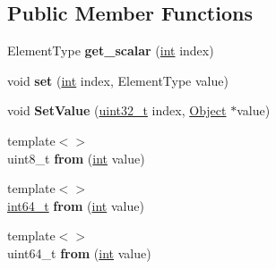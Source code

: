 \subsection*{Public Member Functions}
\begin{DoxyCompactItemize}
\item 
\mbox{\label{classv8_1_1internal_1_1FixedTypedArray_a9b645785a671dab9ef26f1b7332ce643}} 
Element\+Type {\bfseries get\+\_\+scalar} (\mbox{\hyperlink{classint}{int}} index)
\item 
\mbox{\label{classv8_1_1internal_1_1FixedTypedArray_a42f81163d59b755e257227b3f8bcf22e}} 
void {\bfseries set} (\mbox{\hyperlink{classint}{int}} index, Element\+Type value)
\item 
\mbox{\label{classv8_1_1internal_1_1FixedTypedArray_ad125459e798b27470c36a32de783edb1}} 
void {\bfseries Set\+Value} (\mbox{\hyperlink{classuint32__t}{uint32\+\_\+t}} index, \mbox{\hyperlink{classv8_1_1internal_1_1Object}{Object}} $\ast$value)
\item 
\mbox{\label{classv8_1_1internal_1_1FixedTypedArray_accb78c2ea7b11e81eedcdd347c8ed998}} 
{\footnotesize template$<$$>$ }\\uint8\+\_\+t {\bfseries from} (\mbox{\hyperlink{classint}{int}} value)
\item 
\mbox{\label{classv8_1_1internal_1_1FixedTypedArray_ad96f08b364dbdf880dbd224809dc643e}} 
{\footnotesize template$<$$>$ }\\\mbox{\hyperlink{classint64__t}{int64\+\_\+t}} {\bfseries from} (\mbox{\hyperlink{classint}{int}} value)
\item 
\mbox{\label{classv8_1_1internal_1_1FixedTypedArray_a30e78ee165442c3c0dd02836e4e3e51e}} 
{\footnotesize template$<$$>$ }\\uint64\+\_\+t {\bfseries from} (\mbox{\hyperlink{classint}{int}} value)
\item 
\mbox{\label{classv8_1_1internal_1_1FixedTypedArray_a0789eb93346e478fcea91662a1602ccf}} 

\end{DoxyCompactItemize}
